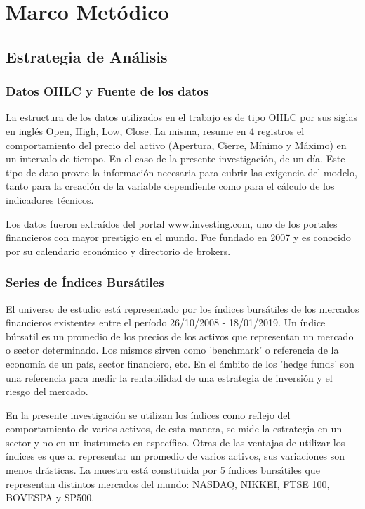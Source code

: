 \documentclass[a4paper,12pt]{Latex/Classes/PhDthesisPSnPDF}
\begin{document}
\chapter{Marco Metódico}
\section{Estrategia de Análisis}

\subsection{Datos OHLC y Fuente de los datos}

La estructura de los datos utilizados en el trabajo es de tipo OHLC por sus siglas en inglés Open, High, Low, Close. La misma, resume en 4 registros el comportamiento del precio del activo (Apertura, Cierre, Mínimo y Máximo) en un intervalo de tiempo. En el caso de la presente investigación, de un día. Este tipo de dato provee la información necesaria para cubrir las exigencia del modelo, tanto para la creación de la variable dependiente como para el cálculo de los indicadores técnicos. 

Los datos fueron extraídos del portal www.investing.com, uno de los portales financieros con mayor prestigio en el mundo. Fue fundado en 2007 y es conocido por su calendario económico y directorio de brokers.

\subsection{Series de Índices Bursátiles}

El universo de estudio está representado por los índices bursátiles de los mercados financieros existentes entre el período 26/10/2008 - 18/01/2019. Un índice búrsatil es un promedio de los precios de los activos que representan un mercado o sector determinado. Los mismos sirven como 'benchmark' o referencia de la economía de un país, sector financiero, etc. En el ámbito de los 'hedge funds' son una referencia para medir la rentabilidad de una estrategia de inversión y el riesgo del mercado.

En la presente investigación se utilizan los índices como reflejo del comportamiento de varios activos, de esta manera, se mide la estrategia en un sector y no en un instrumeto en específico. Otras de las ventajas de utilizar los índices es que al representar un promedio de varios activos, sus variaciones son menos drásticas. La muestra está constituida por 5 índices bursátiles que representan distintos mercados del mundo: NASDAQ, NIKKEI, FTSE 100, BOVESPA y SP500.
\end{document}

